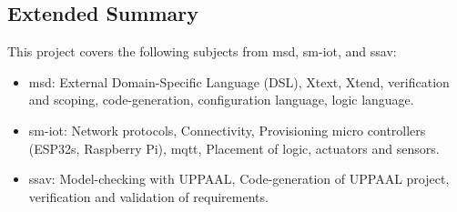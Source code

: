 \subsection*{Extended Summary}

This project covers the following subjects from  \acrfull{msd}, \acrfull{sm-iot}, and \acrfull{ssav}:

\begin{itemize}
    \item \acrshort{msd}: External Domain-Specific Language (DSL), Xtext, Xtend, verification and scoping, code-generation, configuration language, logic language.
    \item \acrshort{sm-iot}: Network protocols, Connectivity, Provisioning micro controllers (ESP32s, Raspberry Pi), \acrshort{mqtt}, Placement of logic, actuators and sensors.
    \item \acrshort{ssav}: Model-checking with UPPAAL, Code-generation of UPPAAL project, verification and validation of requirements.
\end{itemize}
